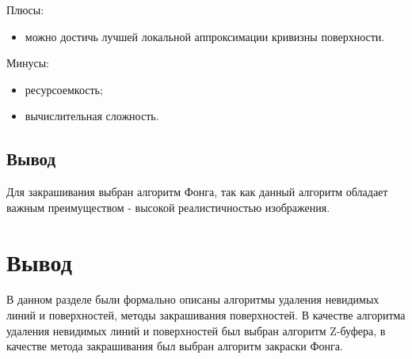 Плюсы:

\begin{itemize}
	\item можно достичь лучшей локальной аппроксимации кривизны поверхности.
\end{itemize}

Минусы:

\begin{itemize}
	\item ресурсоемкость;
	\item вычислительная сложность.
\end{itemize}


\subsection*{Вывод}

Для закрашивания выбран алгоритм Фонга, так как данный алгоритм обладает важным преимуществом - высокой реалистичностью изображения.


\section*{Вывод}

В данном разделе были формально описаны алгоритмы удаления невидимых линий и поверхностей, методы закрашивания поверхностей. В качестве алгоритма удаления невидимых линий и поверхностей был выбран алгоритм Z-буфера, в качестве метода закрашивания был выбран алгоритм закраски Фонга.

